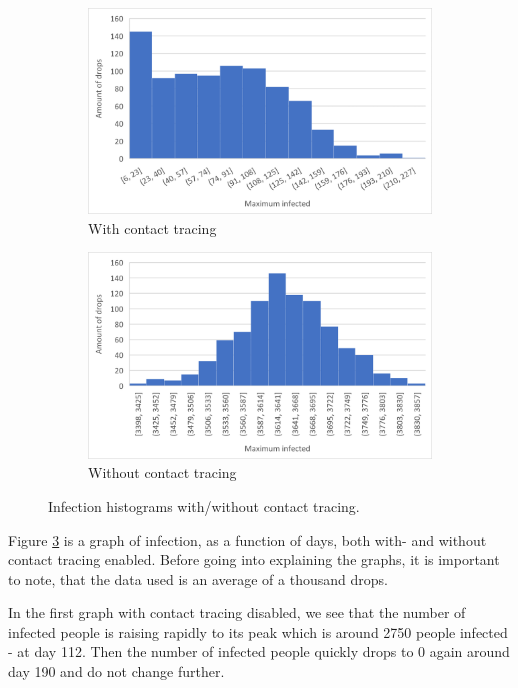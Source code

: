 \begin{figure}[H]
 \centering
  \begin{subfigure}{.45\textwidth}
    \centering
    \includegraphics[width=.95\linewidth]{0_billeder/1k_ct_on_graph.png}
    \caption{With contact tracing}
    \label{Subfig:covidInfGraphA}
  \end{subfigure}
  \begin{subfigure}{.45\textwidth}
    \centering
    \includegraphics[width=.95\linewidth]{0_billeder/1k_ct_off_graph.png}
    \caption{Without contact tracing}
    \label{Subfig:covidInfGraphB}
  \end{subfigure}
 \caption{Infection histograms with/without contact tracing.}
 \label{Fig:covidInfGraphs}
\end{figure}

Figure \ref{Fig:covidInfGraphs} is a graph of infection, as a function of days, both with- and without contact tracing enabled. Before going into explaining the graphs, it is important to note, that the data used is an average of a thousand drops.

In the first graph with contact tracing disabled, we see that the number of infected people is raising rapidly to its peak which is around 2750 people infected - at day 112. Then the number of infected people quickly drops to 0 again around day 190 and do not change further.

